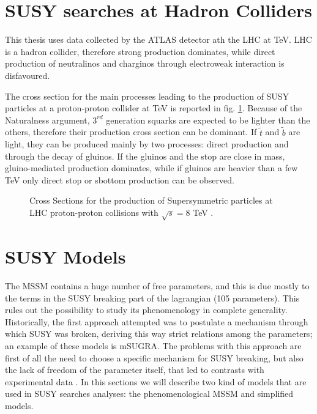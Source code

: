\section{SUSY searches at Hadron Colliders}

This thesis uses data collected by the ATLAS detector ath the LHC at \cmotto TeV. LHC is a hadron collider, therefore strong production dominates, while direct production of neutralinos and charginos through electroweak interaction is disfavoured.

The cross section for the main processes leading to the production of SUSY particles at a proton-proton collider at \cmotto TeV is reported in fig. \ref{fig:SUSYxsec}. Because of the Naturalness argument, $3^{rd}$ generation squarks are expected to be lighter than the others, therefore their production cross section can be dominant. If $\tilde{t}$ and $\tilde{b}$ are light, they can be produced mainly by two processes: direct production and through the decay of gluinos. If the gluinos and the stop are close in mass, gluino-mediated production dominates, while if gluinos are heavier than a few TeV only direct stop or sbottom production can be observed.

\begin{figure}
\begin{center}
\end{center}
\caption[Cross Sections for the production of SUSY particles at LHC]{Cross Sections for the production of Supersymmetric particles at LHC proton-proton collisions with $\sqrt{s}= 8$ TeV \cite{Beenakker:xsec_1} \cite{Beenakker:xsec_2}.}
\label{fig:SUSYxsec}
\end{figure}


\section{SUSY Models}

The MSSM contains a huge number of free parameters, and this is due mostly to the terms in the SUSY breaking part of the lagrangian (105 parameters). This rules out the possibility to study its phenomenology in complete generality. Historically, the first approach attempted was to postulate a mechanism through which SUSY was broken, deriving this way strict relations among the parameters; an example of these models is mSUGRA. The problems with this approach are first of all the need to choose a specific mechanism for SUSY breaking, but also the lack of freedom of the parameter itself, that led to contrasts with experimental data \cite{Cahill-Rowley:pMSSM}. In this sections we will describe two kind of models that are used in SUSY searches analyses: the phenomenological MSSM and simplified models.

